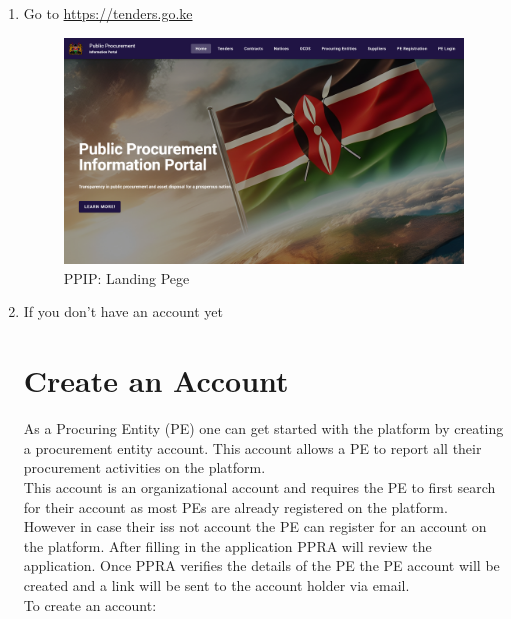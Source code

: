 \documentclass [12pt]{book}
\begin{document}
    \begin{enumerate}
    
    \item Go to \url{https://tenders.go.ke}
    
    \begin{figure}
        \includegraphics[scale = 0.25 ]{public_images/landing_page.png}
        \caption{PPIP: Landing Pege}
        \centering
    \end{figure}
    
    \item If you don’t have an  account yet
\section {Create an Account}

As a Procuring Entity (PE) one can get started with the platform by creating a procurement entity account. This account allows a PE to report all their procurement activities on the platform.\\
This account is an organizational account and requires the PE to first search for their account as most PEs are already registered on the platform. However in case their iss not account the PE can register for an account on the platform. After filling in the application PPRA will review the application. Once PPRA verifies the details of the PE the PE account will be created and a link will be sent to the account holder via email.\\

To create an account:\\ 
    

\end{enumerate}
\end{document}
